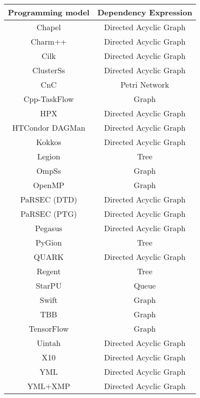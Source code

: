\begin{tabular}{cc}
\hline
Programming model & Dependency Expression \\
\hline
Chapel & Directed Acyclic Graph\\
Charm++ & Directed Acyclic Graph\\
Cilk & Directed Acyclic Graph\\
ClusterSs & Directed Acyclic Graph\\
CnC & Petri Network\\
Cpp-TaskFlow & Graph\\
HPX & Directed Acyclic Graph\\
HTCondor DAGMan & Directed Acyclic Graph\\
Kokkos & Directed Acyclic Graph\\
Legion & Tree\\
OmpSs & Graph\\
OpenMP & Graph\\
PaRSEC (DTD) & Directed Acyclic Graph\\
PaRSEC (PTG) & Directed Acyclic Graph\\
Pegasus & Directed Acyclic Graph\\
PyGion & Tree\\
QUARK & Directed Acyclic Graph\\
Regent & Tree\\
StarPU & Queue\\
Swift & Graph\\
TBB & Graph\\
TensorFlow & Graph\\
Uintah & Directed Acyclic Graph\\
X10 & Directed Acyclic Graph\\
YML & Directed Acyclic Graph\\
YML+XMP & Directed Acyclic Graph\\
\hline
\end{tabular}
